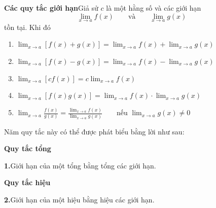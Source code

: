 \noindent
\hspace*{0.28\textwidth}%
\begin{minipage}[t]{0.72\textwidth}
\begin{definitionbox}
\noindent\textbf{\textsf{\color{stewartred}Các quy tắc giới hạn}}\quad Giả sử $c$ là một hằng số và các giới hạn
\[
\lim_{x \to a} f(x) \qquad \text{và} \qquad \lim_{x \to a} g(x)
\]
tồn tại. Khi đó
\begin{enumerate}[label=\textbf{\arabic*.}, leftmargin=1.8em, itemsep=4pt, topsep=3pt, parsep=0pt, partopsep=0pt]
\item $\displaystyle \lim_{x \to a} [f(x) + g(x)] = \lim_{x \to a} f(x) + \lim_{x \to a} g(x)$
\item $\displaystyle \lim_{x \to a} [f(x) - g(x)] = \lim_{x \to a} f(x) - \lim_{x \to a} g(x)$
\item $\displaystyle \lim_{x \to a} [c f(x)] = c \lim_{x \to a} f(x)$
\item $\displaystyle \lim_{x \to a} [f(x) g(x)] = \lim_{x \to a} f(x) \cdot \lim_{x \to a} g(x)$
\item $\displaystyle \lim_{x \to a} \frac{f(x)}{g(x)} = \frac{\displaystyle\lim_{x \to a} f(x)}{\displaystyle\lim_{x \to a} g(x)} \qquad \text{nếu } \lim_{x \to a} g(x) \neq 0$
\end{enumerate}
\end{definitionbox}
\end{minipage}

\vspace{10pt}
\noindent
\hspace*{0.28\textwidth}%
\begin{minipage}[t]{0.72\textwidth}
Năm quy tắc này có thể được phát biểu bằng lời như sau:
\end{minipage}

\vspace{6pt}
\noindent
\begin{minipage}[t]{0.24\textwidth}
\raggedleft
\textcolor{stewartgreen}{\small\textsf{\textbf{Quy tắc tổng}}}\strut
\end{minipage}%
\hspace{0.04\textwidth}%
\begin{minipage}[t]{0.72\textwidth}
\textbf{1.}\quad Giới hạn của một tổng bằng tổng các giới hạn.\strut
\end{minipage}

\vspace{4pt}
\noindent
\begin{minipage}[t]{0.24\textwidth}
\raggedleft
\textcolor{stewartgreen}{\small\textsf{\textbf{Quy tắc hiệu}}}\strut
\end{minipage}%
\hspace{0.04\textwidth}%
\begin{minipage}[t]{0.72\textwidth}
\textbf{2.}\quad Giới hạn của một hiệu bằng hiệu các giới hạn.\strut
\end{minipage}

